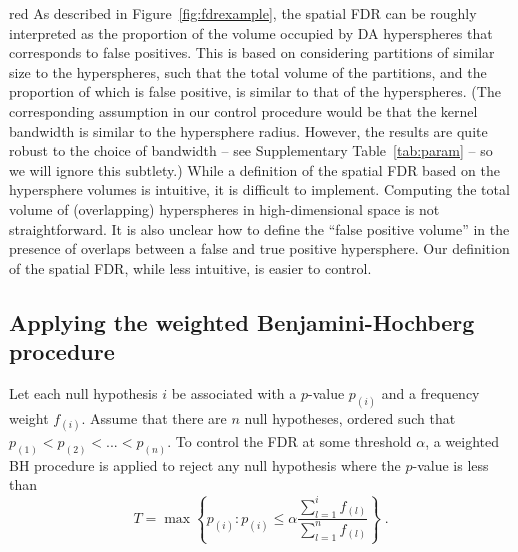 \documentclass{article}
\begin{document}
\begin{color}{red}
As described in Figure~\ref{fig:fdrexample}, the spatial FDR can be roughly interpreted as the proportion of the volume occupied by DA hyperspheres that corresponds to false positives.
This is based on considering partitions of similar size to the hyperspheres, such that the total volume of the partitions, and the proportion of which is false positive, is similar to that of the hyperspheres.
(The corresponding assumption in our control procedure would be that the kernel bandwidth is similar to the hypersphere radius.
However, the results are quite robust to the choice of bandwidth -- see Supplementary Table~\ref{tab:param} -- so we will ignore this subtlety.)
While a definition of the spatial FDR based on the hypersphere volumes is intuitive, it is difficult to implement.
Computing the total volume of (overlapping) hyperspheres in high-dimensional space is not straightforward.
It is also unclear how to define the ``false positive volume'' in the presence of overlaps between a false and true positive hypersphere.
Our definition of the spatial FDR, while less intuitive, is easier to control.
\end{color}

\subsection{Applying the weighted Benjamini-Hochberg procedure}
Let each null hypothesis $i$ be associated with a $p$-value $p_{(i)}$ and a frequency weight $f_{(i)}$.
Assume that there are $n$ null hypotheses, ordered such that $p_{(1)} < p_{(2)} < ... < p_{(n)}$.
To control the FDR at some threshold $\alpha$, a weighted BH procedure is applied \cite{benjamini1997multiple} to reject any null hypothesis where the $p$-value is less than
\[
    T = \max\left\{ p_{(i)} : p_{(i)} \le \alpha \frac{\sum_{l=1}^{i} f_{(l)}}{\sum_{l=1}^{n} f_{(l)}} \right\}  \;.
\]
\end{document}
